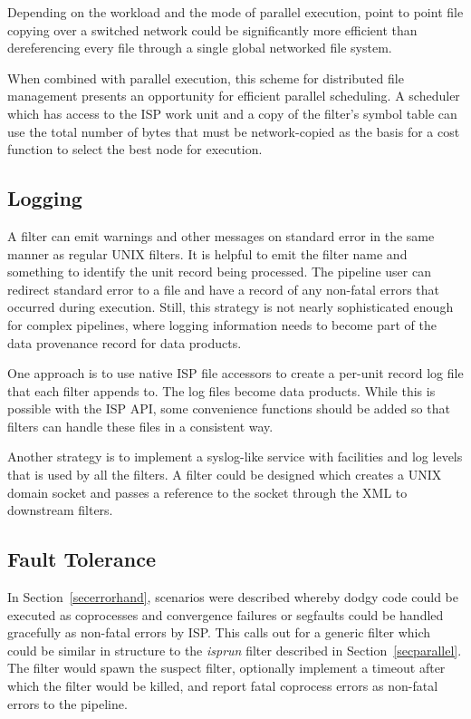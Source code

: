 \documentclass{article}
\begin{document}
Depending on the workload and the mode of parallel execution, 
point to point file copying over a switched network could be significantly 
more efficient than dereferencing every file through a single global networked 
file system.

When combined with parallel execution, this scheme for distributed file
management presents an opportunity for efficient parallel scheduling.
A scheduler which has access to the ISP work unit and a copy of the 
filter's symbol table can use the total number of bytes that must be 
network-copied as the basis for a cost function to select the best node 
for execution.

\subsection{Logging}

A filter can emit warnings and other messages on standard error in the same
manner as regular UNIX filters.  It is helpful to emit the filter name
and something to identify the unit record being processed.  The pipeline
user can redirect standard error to a file and have a record of any non-fatal
errors that occurred during execution.  Still, this strategy is not nearly 
sophisticated enough for complex pipelines, where logging information needs 
to become part of the data provenance record for data products.

One approach is to use native ISP file accessors to create a per-unit record
log file that each filter appends to.  The log files become data products.
While this is possible with the ISP API, some convenience functions should
be added so that filters can handle these files in a consistent way.

Another strategy is to implement a syslog-like service with facilities
and log levels that is used by all the filters.  A filter could be designed
which creates a UNIX domain socket and passes a reference to the socket through
the XML to downstream filters.

\subsection{Fault Tolerance}\label{secfaulttolerance}

In Section~\ref{secerrorhand}, scenarios were described whereby dodgy code
could be executed as coprocesses and convergence failures or segfaults could
be handled gracefully as non-fatal errors by ISP.  This calls out for
a generic filter which could be similar in structure to the {\em isprun}
filter described in Section~\ref{secparallel}.  The filter would spawn
the suspect filter, optionally implement a timeout after which the filter
would be killed, and report fatal coprocess errors as non-fatal errors 
to the pipeline.
\end{document}
